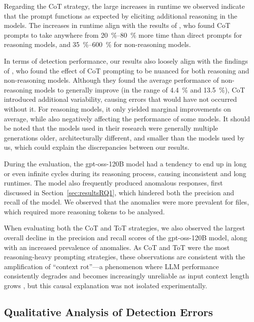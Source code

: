 Regarding the CoT strategy, the large increases in runtime we observed indicate that the prompt functions as expected by eliciting additional reasoning in the models. The increases in runtime align with the results of , who found CoT prompts to take anywhere from \qtyrange[range-phrase = --, range-units = single]{20}{80}{\percent} more time than direct prompts for reasoning models, and \qtyrange[range-phrase = --, range-units = single]{35}{600}{\percent} for non-reasoning models.

In terms of detection performance, our results also loosely align with the findings of , who found the effect of CoT prompting to be nuanced for both reasoning and non-reasoning models. Although they found the average performance of non-reasoning models to generally improve (in the range of \qty{4.4}{\percent} and \qty{13.5}{\percent}), CoT introduced additional variability, causing errors that would have not occurred without it. For reasoning models, it only yielded marginal improvements on average, while also negatively affecting the performance of some models. It should be noted that the models used in their research were generally multiple generations older, architecturally different, and smaller than the models used by us, which could explain the discrepancies between our results.

During the evaluation, the gpt-oss-120B model had a tendency to end up in long or even infinite cycles during its reasoning process, causing inconsistent and long runtimes. The model also frequently produced anomalous responses, first discussed in Section~\ref{sec:resultsRQ1}, which hindered both the precision and recall of the model. We observed that the anomalies were more prevalent for files, which required more reasoning tokens to be analysed.

When evaluating both the CoT and ToT strategies, we also observed the largest overall decline in the precision and recall scores of the gpt-oss-120B model, along with an increased prevalence of anomalies. As CoT and ToT were the most reasoning-heavy prompting strategies, these observations are consistent with the amplification of “context rot”—a phenomenon where LLM performance consistently degrades and becomes increasingly unreliable as input context length grows , but this causal explanation was not isolated experimentally.

\subsection{Qualitative Analysis of Detection Errors}\label{sec:detectionErrors}

